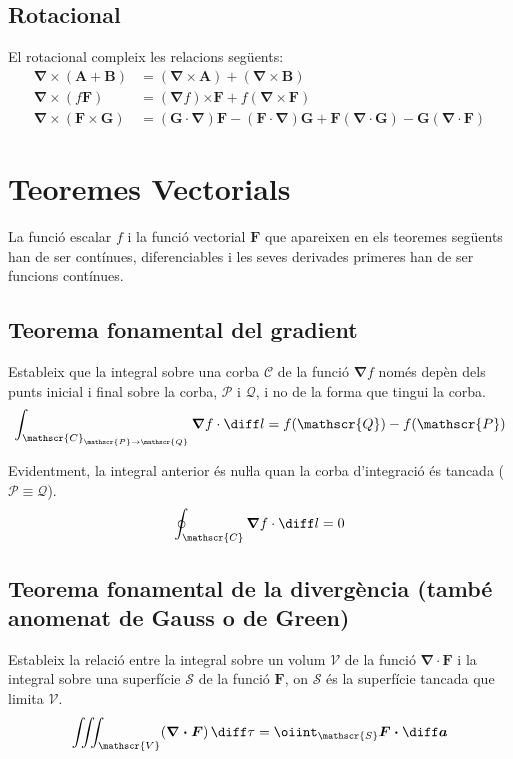 \documentclass[catalan,a4paper,twoside,11pt]{article}
\begin{document}
\subsection{Rotacional}
El rotacional compleix les relacions següents:
\begin{align}
    \boldsymbol{\nabla\times}(\boldsymbol{A}+\boldsymbol{B}) &= (\boldsymbol{\nabla\times A}) + (\boldsymbol{\nabla\times B})\\
    \boldsymbol{\nabla\times}(f\boldsymbol{F}) &=
    (\boldsymbol{\nabla}f)\boldsymbol{\times F} + f(\boldsymbol{\nabla\times F})\\
    \boldsymbol{\nabla\times}(\boldsymbol{F\times G}) &= (\boldsymbol{G\cdot\nabla})\boldsymbol{F} - (\boldsymbol{F\cdot\nabla})\boldsymbol{G} + \boldsymbol{F}(\boldsymbol{\nabla\cdot G}) - \boldsymbol{G}(\boldsymbol{\nabla\cdot F})
\end{align}


\section{Teoremes Vectorials}

La funció escalar $f$ i la funció vectorial $\boldsymbol{F}$ que apareixen en els teoremes següents han de ser contínues, diferenciables i les seves derivades primeres han de ser funcions contínues.

\subsection{Teorema fonamental del gradient}
Estableix que la integral sobre una corba $\mathscr{C}$ de la funció $\boldsymbol{\nabla} f$ només depèn dels punts inicial i final sobre la corba, $\mathscr{P}$ i $\mathscr{Q}$, i no de la forma que tingui la corba.
\begin{equation}
    \int_{\mathscr{C}_{\mathscr{P}\rightarrow \mathscr{Q}}} \boldsymbol{\nabla}f \cdot \diff l = f(\mathscr{Q})-f(\mathscr{P})
\end{equation}

Evidentment, la integral anterior és nuŀla quan la corba d'integració és tancada ($\mathscr{P} \equiv \mathscr{Q}$).
\begin{equation}
    \oint_\mathscr{C} \boldsymbol{\nabla}f \cdot \diff l = 0
\end{equation}

\subsection{Teorema fonamental de la divergència (també anomenat de Gauss o de Green)}
Estableix la relació entre la integral sobre un volum $\mathscr{V}$ de la funció $\boldsymbol{\nabla\cdot F}$ i la integral sobre una superfície $\mathscr{S}$ de la funció $\boldsymbol{F}$, on $\mathscr{S}$ és la superfície tancada que limita $\mathscr{V}$.
\begin{equation}
    \iiint_\mathscr{V}(\boldsymbol{\nabla\cdot F})\,\diff \tau = \oiint_\mathscr{S}\boldsymbol{F\cdot\diff a}
\end{equation}
\end{document}
